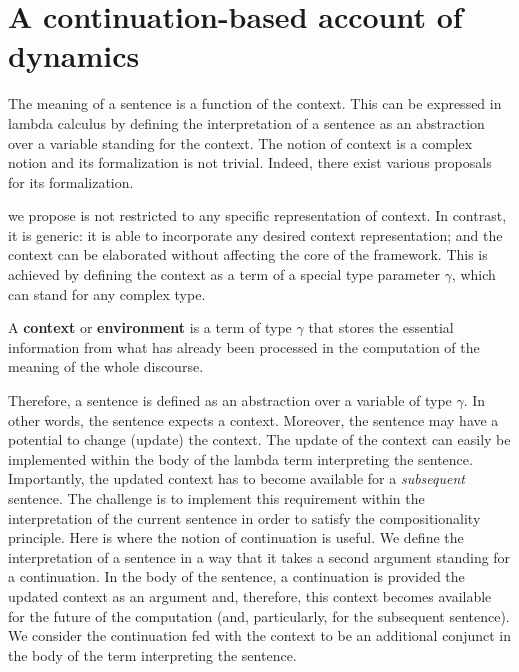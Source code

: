 \section{A continuation-based account of dynamics} \label{sec:cont_based_dyn}

  
The meaning of a sentence is a function of the context. This can be expressed in lambda calculus by defining the interpretation of a sentence as an abstraction over a variable standing for the context. The notion of context is a complex notion and its formalization is not trivial. Indeed, there exist various proposals for its formalization.  

{\FullName} we propose is not restricted to any specific representation of context. In contrast, it is generic: it is able to incorporate any desired context representation; and the context can be elaborated without affecting the core of the framework. This is achieved by defining the context as a term of a special type parameter $\gamma$, which can stand for any complex type.


\begin{definition} A \textbf{context} or \textbf{environment} is a term of type $\gamma$ that stores the essential information from what has already been processed in the computation of the meaning of the whole discourse.
\end{definition}

Therefore, a sentence is defined as an abstraction over a variable of type $\gamma$. In other words, the sentence expects a context. Moreover, the sentence may have a potential to change (update) the context. The update of the context can easily be implemented within the body of the lambda term interpreting the sentence. Importantly, the updated context has to become available for a \emph{subsequent} sentence. The challenge is to implement this requirement within the interpretation of the current sentence in order to satisfy the compositionality principle. Here is where the notion of continuation is useful. We define the interpretation of a sentence in a way that it takes a second argument standing for a continuation. In the body of the sentence, a continuation is provided the updated context as an argument and, therefore, this context becomes available for the future of the computation (and, particularly, for the subsequent sentence). We consider the continuation fed with the context to be an additional conjunct in the body of the term interpreting the sentence.


